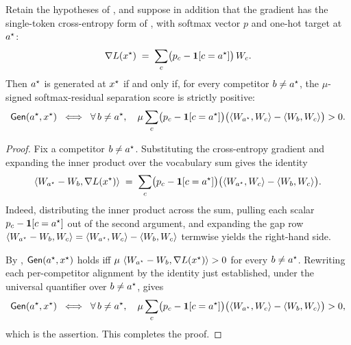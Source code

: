 \begin{corollary}
\label{cor:ce}
Retain the hypotheses of , and suppose in addition that the gradient has the
single-token cross-entropy form of , with softmax vector $p$ and one-hot
target at $a^{\star}$:
\begin{align*}
\nabla L(x^{\star}) \;=\; \sum_{c} \bigl(p_c - \mathbf{1}\!\left[c = a^{\star}\right]\bigr)\, W_c .
\end{align*}
Then $a^{\star}$ is generated at $x^{\star}$ if and only if, for every competitor $b \ne a^{\star}$,
the $\mu$-signed softmax-residual separation score is strictly positive:
\begin{align*}
\mathsf{Gen}(a^{\star}, x^{\star})
\;\iff\;
\forall\, b \ne a^{\star},\quad
\mu \sum_{c} \bigl(p_c - \mathbf{1}\!\left[c = a^{\star}\right]\bigr)
   \bigl(\left\langle W_{a^{\star}}, W_c \right\rangle - \left\langle W_{b}, W_c \right\rangle\bigr) > 0.
\end{align*}
\end{corollary}

\begin{proof}
Fix a competitor $b \ne a^{\star}$. Substituting the cross-entropy gradient and expanding the
inner product over the vocabulary sum gives the identity
\begin{align*}
\left\langle W_{a^{\star}} - W_{b}, \nabla L(x^{\star}) \right\rangle
\;=\;
\sum_{c} \bigl(p_c - \mathbf{1}\!\left[c = a^{\star}\right]\bigr)
   \bigl(\left\langle W_{a^{\star}}, W_c \right\rangle - \left\langle W_{b}, W_c \right\rangle\bigr).
\end{align*}
Indeed, distributing the inner product across the sum, pulling each scalar
$p_c - \mathbf{1}\!\left[c = a^{\star}\right]$ out of the second argument, and expanding the gap row
$\left\langle W_{a^{\star}} - W_{b}, W_c \right\rangle = \left\langle W_{a^{\star}}, W_c \right\rangle - \left\langle W_{b}, W_c \right\rangle$ termwise
yields the right-hand side.

By , $\mathsf{Gen}(a^{\star}, x^{\star})$ holds iff
$\mu\,\left\langle W_{a^{\star}} - W_{b}, \nabla L(x^{\star}) \right\rangle > 0$ for every $b \ne a^{\star}$. Rewriting
each per-competitor alignment by the identity just established, under the universal quantifier
over $b \ne a^{\star}$, gives
\begin{align*}
\mathsf{Gen}(a^{\star}, x^{\star})
\;\iff\;
\forall\, b \ne a^{\star},\quad
\mu \sum_{c} \bigl(p_c - \mathbf{1}\!\left[c = a^{\star}\right]\bigr)
   \bigl(\left\langle W_{a^{\star}}, W_c \right\rangle - \left\langle W_{b}, W_c \right\rangle\bigr) > 0,
\end{align*}
which is the assertion. This completes the proof.
\end{proof}


